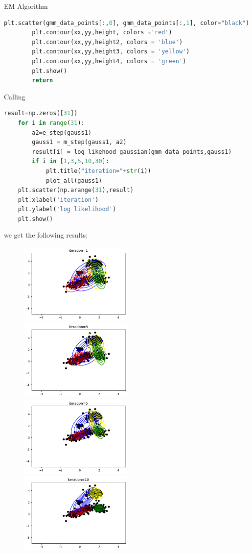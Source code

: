 \documentclass[
ngerman,
]{tudaexercise}
\begin{document}
\begin{task}{EM Algorithm}
\begin{subtask}
\begin{lstlisting}[language=Python]
		plt.scatter(gmm_data_points[:,0], gmm_data_points[:,1], color="black")
		plt.contour(xx,yy,height, colors ='red')
		plt.contour(xx,yy,height2, colors = 'blue')
		plt.contour(xx,yy,height3, colors = 'yellow')
		plt.contour(xx,yy,height4, colors = 'green')
		plt.show()
		return
\end{lstlisting}
Calling
\begin{lstlisting}[language=Python]
	result=np.zeros([31])
	for i in range(31):
		a2=e_step(gauss1)
		gauss1 = m_step(gauss1, a2)
		result[i] = log_likehood_gaussian(gmm_data_points,gauss1)
		if i in [1,3,5,10,30]:
			plt.title("iteration="+str(i))
			plot_all(gauss1)
	plt.scatter(np.arange(31),result)
	plt.xlabel('iteration')
	plt.ylabel('log likelihood')
	plt.show()
\end{lstlisting}
we get the following results:
\begin{figure}[H]
	\includegraphics[width=0.5\textwidth]{i1}
	\includegraphics[width=0.5\textwidth]{i2}
	\includegraphics[width=0.5\textwidth]{i3}
	\includegraphics[width=0.5\textwidth]{i4}

\end{figure}
\end{subtask}
\end{task}
\end{document}
